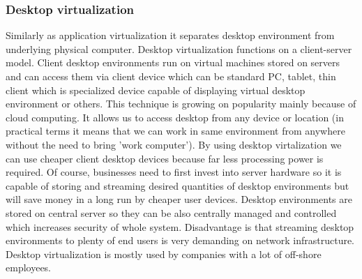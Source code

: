 \subsubsection{Desktop virtualization} \label{desktop_virt}
Similarly as application virtualization it separates desktop environment from underlying physical computer. Desktop virtualization functions on a client-server model. Client desktop environments run on virtual machines stored on servers and can access them via client device which can be standard PC, tablet, thin client which is specialized device capable of displaying virtual desktop environment or others. This technique is growing on popularity mainly because of cloud computing. It allows us to access desktop from any device or location (in practical terms it means that we can work in same environment from anywhere without the need to bring 'work computer'). By using desktop virtalization we can use cheaper client desktop devices because far less processing power is required. Of course, businesses need to first invest into server hardware so it is capable of storing and streaming desired quantities of desktop environments but will save money in a long run by cheaper user devices. Desktop environments are stored on central server so they can be also centrally managed and controlled which increases security of whole system. Disadvantage is that streaming desktop environments to plenty of end users is very demanding on network infrastructure. Desktop virtualization is mostly used by companies with a lot of off-shore employees.

